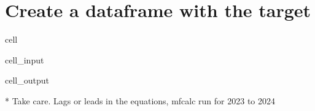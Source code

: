 \documentclass[letterpaper,10pt,english]{jupyterBook}
\begin{document}
\section{Create a dataframe with the target}
\label{\detokenize{content/howto/targetinstruments/One target one instrument with 3 instrument variables:create-a-dataframe-with-the-target}}
\begin{sphinxuseclass}{cell}\begin{sphinxVerbatimInput}

\begin{sphinxuseclass}{cell_input}
\begin{sphinxVerbatim}[commandchars=\\\{\}]
  \PYG{p}{[}\PYG{p}{[}\PYG{p}{]}\PYG{p}{]}     
   
\end{sphinxVerbatim}

\end{sphinxuseclass}\end{sphinxVerbatimInput}
\begin{sphinxVerbatimOutput}

\begin{sphinxuseclass}{cell_output}
\begin{sphinxVerbatim}[commandchars=\\\{\}]
* Take care. Lags or leads in the equations, mfcalc run for 2023 to 2024
\end{sphinxVerbatim}

\end{sphinxuseclass}\end{sphinxVerbatimOutput}

\end{sphinxuseclass}
\end{document}
